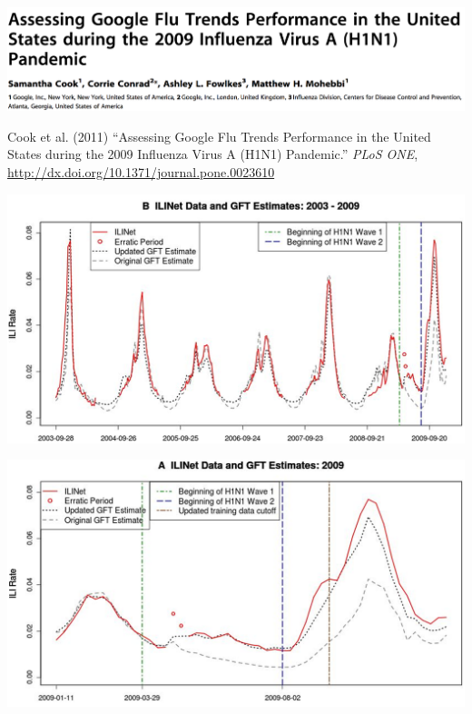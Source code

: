 \documentclass[aspectratio=169]{beamer}
\def\vf{\vfill}
\begin{document}
\begin{frame}

\begin{center}
\includegraphics[width=\textwidth]{figures/cook_assessing_2011_title}
\end{center}

\vf

Cook et al. (2011) ``Assessing Google Flu Trends Performance in the United States during the 2009 Influenza Virus A (H1N1) Pandemic.'' \textit{PLoS ONE}, \url{http://dx.doi.org/10.1371/journal.pone.0023610}

\end{frame}
\begin{frame}

\begin{center}
\includegraphics[width=\textwidth]{figures/cook_assessing_2011_fig2b}
\end{center}

\end{frame}
\begin{frame}

\begin{center}
\includegraphics[width=\textwidth]{figures/cook_assessing_2011_fig2a}
\end{center}

\end{frame}
\end{document}
